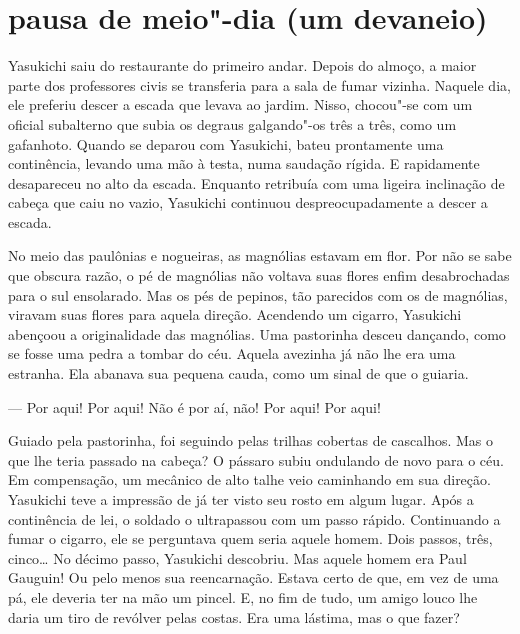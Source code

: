 \section*{pausa de meio"-dia (um devaneio)}

Yasukichi saiu do restaurante do primeiro andar. Depois do almoço, a
maior parte dos professores civis se transferia para a sala de fumar
vizinha. Naquele dia, ele preferiu descer a escada que levava ao
jardim. Nisso, chocou"-se com um oficial subalterno que subia os degraus
galgando"-os três a três, como um gafanhoto. Quando se deparou com
Yasukichi, bateu prontamente uma continência, levando uma mão à testa,
numa saudação rígida. E rapidamente desapareceu no alto da escada.
Enquanto retribuía com uma ligeira inclinação de cabeça que caiu no
vazio, Yasukichi continuou despreocupadamente a descer a escada.

No meio das paulônias e nogueiras, as magnólias estavam em flor. Por não
se sabe que obscura razão, o pé de magnólias não voltava suas flores
enfim desabrochadas para o sul ensolarado. Mas os pés de pepinos, tão
parecidos com os de magnólias, viravam suas flores para aquela direção.
Acendendo um cigarro, Yasukichi abençoou a originalidade das magnólias.
Uma pastorinha desceu dançando, como se fosse uma pedra a tombar do
céu. Aquela avezinha já não lhe era uma estranha. Ela abanava sua
pequena cauda, como um sinal de que o guiaria.

--- Por aqui! Por aqui! Não é por aí, não! Por aqui! Por aqui!

Guiado pela pastorinha, foi seguindo pelas trilhas cobertas de
cascalhos. Mas o que lhe teria passado na cabeça? O pássaro subiu
ondulando de novo para o céu. Em compensação, um mecânico de alto talhe
veio caminhando em sua direção. Yasukichi teve a impressão de já ter
visto seu rosto em algum lugar. Após a continência de lei, o soldado o
ultrapassou com um passo rápido. Continuando a fumar o cigarro, ele se
perguntava quem seria aquele homem. Dois passos, três, cinco\ldots{} No
décimo passo, Yasukichi descobriu. Mas aquele homem era Paul Gauguin!
Ou pelo menos sua reencarnação. Estava certo de que, em vez de uma pá,
ele deveria ter na mão um pincel. E, no fim de tudo, um amigo louco lhe
daria um tiro de revólver pelas costas. Era uma lástima, mas o que fazer?

